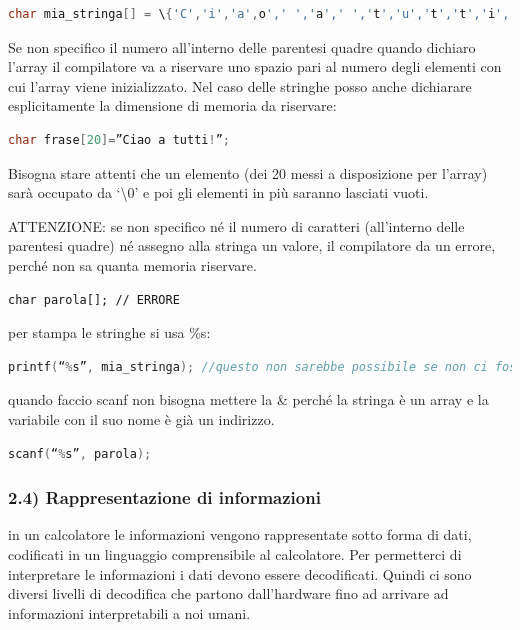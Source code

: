\documentclass[
  paper=a4,
  oneside  ,captions=tableheading
]{scrbook}
\begin{document}
\begin{lstlisting}[language={C++}]
char mia_stringa[] = \{'C','i','a',o',' ','a',' ','t','u','t','t','i','!','\textbackslash0'\};
\end{lstlisting}

Se non specifico il numero all'interno delle parentesi quadre quando
dichiaro l'array il compilatore va a riservare uno spazio pari al numero
degli elementi con cui l'array viene inizializzato. Nel caso delle
stringhe posso anche dichiarare esplicitamente la dimensione di memoria
da riservare:

\begin{lstlisting}[language={C++}]
char frase[20]=”Ciao a tutti!”;
\end{lstlisting}

Bisogna stare attenti che un elemento (dei 20 messi a disposizione per
l'array) sarà occupato da `\textbackslash0' e poi gli elementi in più
saranno lasciati vuoti.

ATTENZIONE: se non specifico né il numero di caratteri (all'interno
delle parentesi quadre) né assegno alla stringa un valore, il
compilatore da un errore, perché non sa quanta memoria riservare.

\begin{lstlisting}
char parola[]; // ERRORE
\end{lstlisting}

per stampa le stringhe si usa \%s:

\begin{lstlisting}[language={C++}]
printf(“%s”, mia_stringa); //questo non sarebbe possibile se non ci fosse il carattere terminatore perché non saprei dove fermarmi 
\end{lstlisting}

quando faccio scanf non bisogna mettere la \& perché la stringa è un
array e la variabile con il suo nome è già un indirizzo.

\begin{lstlisting}[language={C++}]
scanf(“%s”, parola);
\end{lstlisting}

\hypertarget{rappresentazione-di-informazioni}{%
\subsubsection{2.4) Rappresentazione di
informazioni}\label{rappresentazione-di-informazioni}}

in un calcolatore le informazioni vengono rappresentate sotto forma di
dati, codificati in un linguaggio comprensibile al calcolatore. Per
permetterci di interpretare le informazioni i dati devono essere
decodificati. Quindi ci sono diversi livelli di decodifica che partono
dall'hardware fino ad arrivare ad informazioni interpretabili a noi
umani.
\end{document}
